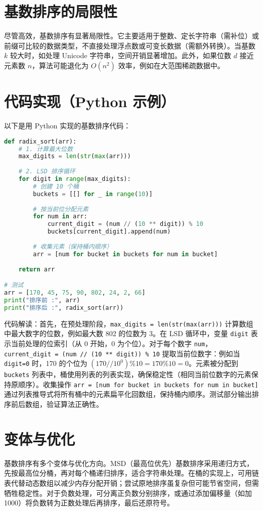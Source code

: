 \chapter{基数排序的局限性}
尽管高效，基数排序有显著局限性。它主要适用于整数、定长字符串（需补位）或前缀可比较的数据类型，不直接处理浮点数或可变长数据（需额外转换）。当基数 $k$ 较大时，如处理 Unicode 字符串，空间开销显著增加。此外，如果位数 $d$ 接近元素数 $n$，算法可能退化为 $O(n^2)$ 效率，例如在大范围稀疏数据中。\par
\chapter{代码实现（Python 示例）}
以下是用 Python 实现的基数排序代码：\par
\begin{lstlisting}[language=python]
def radix_sort(arr):
    # 1. 计算最大位数
    max_digits = len(str(max(arr)))
    
    # 2. LSD 排序循环
    for digit in range(max_digits):
        # 创建 10 个桶
        buckets = [[] for _ in range(10)]
        
        # 按当前位分配元素
        for num in arr:
            current_digit = (num // (10 ** digit)) % 10
            buckets[current_digit].append(num)
        
        # 收集元素（保持桶内顺序）
        arr = [num for bucket in buckets for num in bucket]
    
    return arr

# 测试
arr = [170, 45, 75, 90, 802, 24, 2, 66]
print("排序前 :", arr)
print("排序后 :", radix_sort(arr))
\end{lstlisting}
代码解读：首先，在预处理阶段，\texttt{max\_{}digits = len(str(max(arr)))} 计算数组中最大数字的位数，例如最大数 802 的位数为 3。在 LSD 循环中，变量 \texttt{digit} 表示当前处理的位索引（从 0 开始，0 为个位）。对于每个数字 \texttt{num}，\texttt{current\_{}digit = (num // (10 ** digit)) \%{} 10} 提取当前位数字：例如当 \texttt{digit=0} 时，170 的个位为 $(170 // 10^0) \% 10 = 170 \% 10 = 0$。元素被分配到 \texttt{buckets} 列表中，桶使用列表的列表实现，确保稳定性（相同当前位数字的元素保持原顺序）。收集操作 \texttt{arr = [num for bucket in buckets for num in bucket]} 通过列表推导式将所有桶中的元素扁平化回数组，保持桶内顺序。测试部分输出排序前后数组，验证算法正确性。\par
\chapter{变体与优化}
基数排序有多个变体与优化方向。MSD（最高位优先）基数排序采用递归方式，先按最高位分桶，再对每个桶递归排序，适合字符串处理。在桶的实现上，可用链表代替动态数组以减少内存分配开销；尝试原地排序虽复杂但可能节省空间，但需牺牲稳定性。对于负数处理，可分离正负数分别排序，或通过添加偏移量（如加 1000）将负数转为正数处理后再排序，最后还原符号。\par
